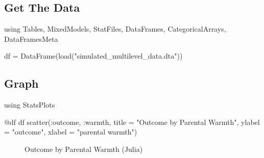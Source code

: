 \documentclass[
  letterpaper,
  DIV=11,
  numbers=noendperiod]{scrreprt}
\newenvironment{Shaded}{\begin{snugshade}}{\end{snugshade}}
\newcommand{\BuiltInTok}[1]{\textcolor[rgb]{0.00,0.23,0.31}{#1}}
\newcommand{\FunctionTok}[1]{\textcolor[rgb]{0.28,0.35,0.67}{#1}}
\newcommand{\ImportTok}[1]{\textcolor[rgb]{0.00,0.46,0.62}{#1}}
\newcommand{\NormalTok}[1]{\textcolor[rgb]{0.00,0.23,0.31}{#1}}
\newcommand{\OperatorTok}[1]{\textcolor[rgb]{0.37,0.37,0.37}{#1}}
\newcommand{\PreprocessorTok}[1]{\textcolor[rgb]{0.68,0.00,0.00}{#1}}
\newcommand{\StringTok}[1]{\textcolor[rgb]{0.13,0.47,0.30}{#1}}
\begin{document}
\subsection{Get The Data}\label{get-the-data-2}

\begin{Shaded}
\begin{Highlighting}[]
\ImportTok{using} \BuiltInTok{Tables}\NormalTok{, }\BuiltInTok{MixedModels}\NormalTok{, }\BuiltInTok{StatFiles}\NormalTok{, }\BuiltInTok{DataFrames}\NormalTok{, }\BuiltInTok{CategoricalArrays}\NormalTok{, }\BuiltInTok{DataFramesMeta}

\NormalTok{df }\OperatorTok{=} \FunctionTok{DataFrame}\NormalTok{(}\FunctionTok{load}\NormalTok{(}\StringTok{"simulated\_multilevel\_data.dta"}\NormalTok{))}
\end{Highlighting}
\end{Shaded}

\subsection{Graph}\label{graph-2}

\begin{Shaded}
\begin{Highlighting}[]
\ImportTok{using} \BuiltInTok{StatsPlots}

\PreprocessorTok{@df}\NormalTok{ df }\FunctionTok{scatter}\NormalTok{(}\OperatorTok{:}\NormalTok{outcome, }\OperatorTok{:}\NormalTok{warmth, }
\NormalTok{               title }\OperatorTok{=} \StringTok{"Outcome by Parental Warmth"}\NormalTok{,}
\NormalTok{               ylabel }\OperatorTok{=} \StringTok{"outcome"}\NormalTok{,}
\NormalTok{               xlabel }\OperatorTok{=} \StringTok{"parental warmth"}\NormalTok{)}
\end{Highlighting}
\end{Shaded}

\begin{figure}[H]


\caption{\label{fig-Julia}Outcome by Parental Warmth (Julia)}

\end{figure}%
\end{document}
